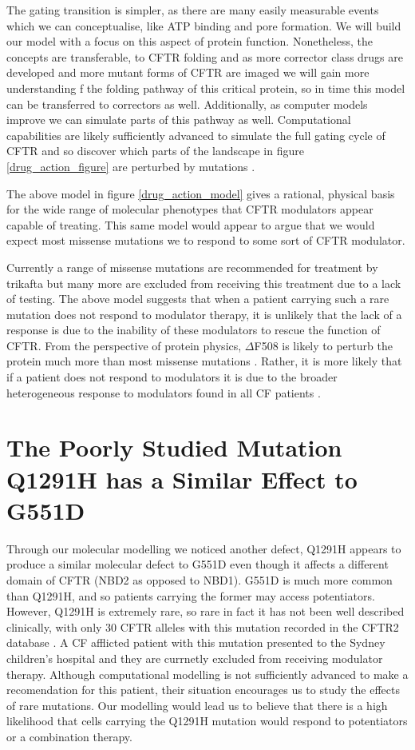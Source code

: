 The gating transition is simpler, as there are many easily measurable events which we can conceptualise, like ATP binding and pore formation. We will build our model with a focus on this aspect of protein function. Nonetheless, the concepts are transferable, to CFTR folding and as more corrector class drugs are developed and more mutant forms of CFTR are imaged we will gain more understanding f the folding pathway of this critical protein, so in time this model can be transferred to correctors as well. Additionally, as computer models improve we can simulate parts of this pathway as well. Computational capabilities are likely sufficiently advanced to simulate the full gating cycle of CFTR and so discover which parts of the landscape in figure \ref{drug_action_figure} are perturbed by mutations \cite{}. 

The above model in figure \ref{drug_action_model} gives a rational, physical basis for the wide range of molecular phenotypes that CFTR modulators appear capable of treating. This same model would appear to argue that we would expect most missense mutations we to respond to some sort of CFTR modulator. 

Currently a range of missense mutations are recommended for treatment by trikafta but many more are excluded from receiving this treatment due to a lack of testing. The above model suggests that when a patient carrying such a rare mutation does not respond to modulator therapy, it is unlikely that the lack of a response is due to the inability of these modulators to rescue the function of CFTR. From the perspective of protein physics, $\Delta$F508 is likely to perturb the protein much more than most missense mutations \cite{}. Rather, it is more likely that if a patient does not respond to modulators it is due to the broader heterogeneous response to modulators found in all CF patients \cite{}. 


\section{The Poorly Studied Mutation Q1291H has a Similar Effect to G551D}

Through our molecular modelling we noticed another defect, Q1291H appears to produce a similar molecular defect to G551D even though it affects a different domain of CFTR (NBD2 as opposed to NBD1). G551D is much more common than Q1291H, and so patients carrying the former may access potentiators. However, Q1291H is extremely rare, so rare in fact it has not been well described clinically, with only 30 CFTR alleles with this mutation recorded in the CFTR2 database \cite{cftr2}. A CF afflicted patient with this mutation presented to the Sydney children's hospital and they are currnetly excluded from receiving modulator therapy. Although computational modelling is not sufficiently advanced to make a recomendation for this patient, their situation encourages us to study the effects of rare mutations. Our modelling would lead us to believe that there is a high likelihood that cells carrying the Q1291H mutation would respond to potentiators or a combination therapy. 

